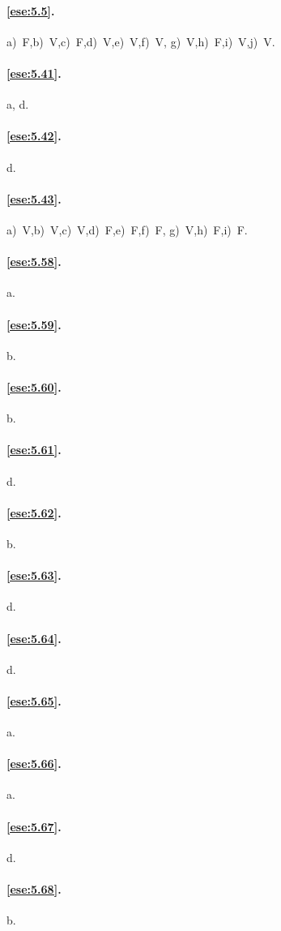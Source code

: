 \paragraph{\ref{ese:5.5}.}
a)~F,\quad b)~V,\quad c)~F,\quad d)~V,\quad e)~V,\quad f)~V,\quad 
g)~V,\quad h)~F,\quad i)~V,\quad j)~V.

\paragraph{\ref{ese:5.41}.}
a, d.

\paragraph{\ref{ese:5.42}.}
d.

\paragraph{\ref{ese:5.43}.}
a)~V,\quad b)~V,\quad c)~V,\quad d)~F,\quad e)~F,\quad f)~F,\quad 
g)~V,\quad h)~F,\quad i)~F.

\paragraph{\ref{ese:5.58}.}
a.

\paragraph{\ref{ese:5.59}.}
b.

\paragraph{\ref{ese:5.60}.}
b.

\paragraph{\ref{ese:5.61}.}
d.

\paragraph{\ref{ese:5.62}.}
b.

\paragraph{\ref{ese:5.63}.}
d.

\paragraph{\ref{ese:5.64}.}
d.

\paragraph{\ref{ese:5.65}.}
a.

\paragraph{\ref{ese:5.66}.}
a.

\paragraph{\ref{ese:5.67}.}
d.

\paragraph{\ref{ese:5.68}.}
b.

\endgroup
